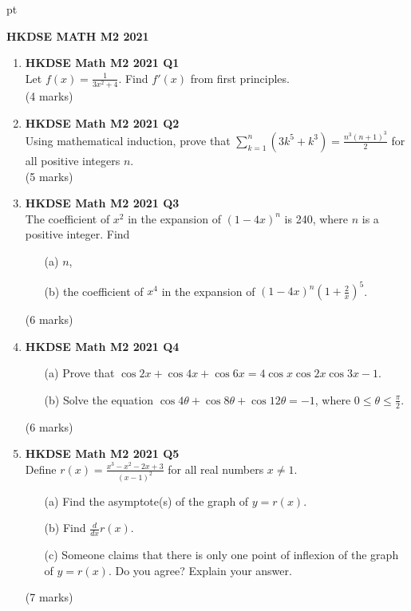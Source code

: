 \documentclass[12pt]{article}
\begin{document}
 pt
\begin{center}
	{\large \bf HKDSE MATH M2 2021}\\
	\vspace{2 mm}

\end{center}
\vspace{0.05cm}

\begin{enumerate}
	\item \textbf{HKDSE Math M2 2021 Q1}\\
	Let $\displaystyle f(x) = \frac{1}{3x^{2}+4}$. Find $f'(x)$ from first principles. \\
	(4 marks)


	\item \textbf{HKDSE Math M2 2021 Q2}\\
	Using mathematical induction, prove that $\displaystyle \sum_{k = 1}^{n} (3k^{5} + k^{3}) = \frac{n^{3} (n+1)^{3}}{2}$ for all positive integers $n$. \\
	(5 marks)


	\item \textbf{HKDSE Math M2 2021 Q3}\\
	The coefficient of $x^2$ in the expansion of $(1-4x)^n$ is 240, where $n$ is a positive integer. Find
	\begin{enumerate}
		\item[(a)]
		$n$,
		\item[(b)]
		the coefficient of $x^4$ in the expansion of $\displaystyle(1-4x)^n\left(1+\frac{2}{x}\right)^5$. 
	\end{enumerate}
	(6 marks)

	\item \textbf{HKDSE Math M2 2021 Q4}
	\begin{enumerate}
		\item [(a)] Prove that $\cos{2x} + \cos {4x} + \cos {6x} = 4\cos{x}\cos{2x}\cos{3x} -1$.
		\item [(b)] Solve the equation $\cos{4\theta} + \cos{8\theta} + \cos{12\theta} = -1$, where $\displaystyle0 \leq \theta \leq \frac{\pi}{2}$.
	\end{enumerate}
	(6 marks)

	\item \textbf{HKDSE Math M2 2021 Q5}\\
	Define $\displaystyle r(x) = \frac{x^3 - x^2 -2x + 3}{(x-1)^2}$ for all real numbers $x \neq 1$.
	\begin{enumerate}
		\item [(a)] Find the asymptote(s) of the graph of $y = r(x)$.
		\item [(b)] Find $\displaystyle\frac{d}{dx}r(x)$.
		\item [(c)] Someone claims that there is only one point of inflexion of the graph of $y = r(x)$. Do you agree? Explain your answer.
	\end{enumerate}
	(7 marks)


\end{enumerate}
\end{document}

